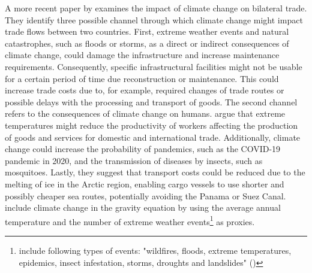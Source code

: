 A more recent paper by \textcite{Martinez2023} examines the impact of climate change on bilateral trade. They identify three possible channel through which climate change might impact trade flows between two countries. First, extreme weather events and natural catastrophes, such as floods or storms, as a direct or indirect consequences of climate change, could damage the infrastructure and increase maintenance requirements. Consequently, specific infrastructural facilities might not be usable for a certain period of time due reconstruction or maintenance. This could increase trade costs due to, for example, required changes of trade routes or possible delays with the processing and transport of goods. The second channel refers to the consequences of climate change on humans. \textcite{Martinez2023} argue that extreme temperatures might reduce the productivity of workers affecting the production of goods and services for domestic and international trade. Additionally, climate change could increase the probability of pandemics, such as the COVID-19 pandemic in 2020, and the transmission of diseases by insects, such as mosquitoes. Lastly, they suggest that transport costs could be reduced due to the melting of ice in the Arctic region, enabling cargo vessels to use shorter and possibly cheaper sea routes, potentially avoiding the Panama or Suez Canal. \textcite{Martinez2023} include climate change in the gravity equation by using the average annual temperature and the number of extreme weather events\footnote{\textcite{Martinez2023} include following types of events: "wildfires, floods, extreme temperatures, epidemics, insect infestation, storms, droughts and landslides" (\cite{Martinez2023})} as proxies.































